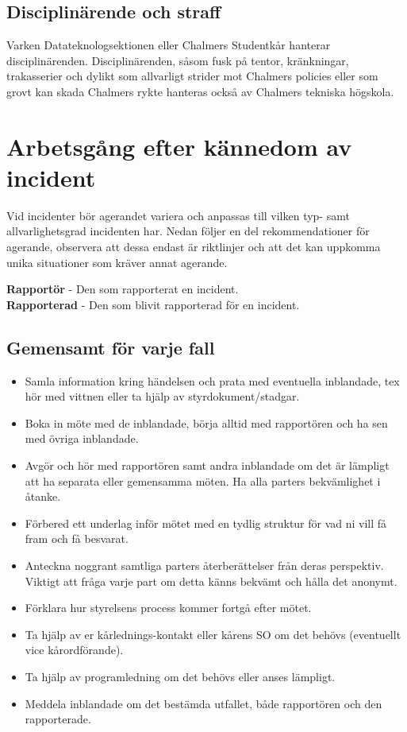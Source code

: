 \documentclass{dtek}
\begin{document}
\subsection{Disciplinärende och straff}
Varken Datateknologsektionen eller Chalmers Studentkår hanterar
disciplinärenden. Disciplinärenden, såsom fusk på tentor, kränkningar, trakasserier och dylikt som allvarligt strider mot Chalmers policies eller som
grovt kan skada Chalmers rykte hanteras också av Chalmers tekniska högskola.

\section{Arbetsgång efter kännedom av incident}
Vid incidenter bör agerandet variera och anpassas till vilken typ- samt allvarlighetsgrad incidenten har. Nedan följer en del rekommendationer för agerande, observera att dessa endast är riktlinjer och att det kan uppkomma unika situationer som kräver annat agerande. 

\textbf{Rapportör} - Den som rapporterat en incident. \\
\textbf{Rapporterad} - Den som blivit rapporterad för en incident. 

\subsection{Gemensamt för varje fall}

\begin{itemize}
    \item Samla information kring händelsen och prata med eventuella inblandade, tex hör med vittnen eller ta hjälp av styrdokument/stadgar. 
    \item Boka in möte med de inblandade, börja alltid med rapportören och ha sen med övriga inblandade.
    \item Avgör och hör med rapportören samt andra inblandade om det är lämpligt att ha separata eller gemensamma möten. Ha alla parters bekvämlighet i åtanke. 
    \item Förbered ett underlag inför mötet med en tydlig struktur för vad ni vill få fram och få besvarat. 
    \item Anteckna noggrant samtliga parters återberättelser från deras perspektiv. Viktigt att fråga varje part om detta känns bekvämt och hålla det anonymt. 
    \item Förklara hur styrelsens process kommer fortgå efter mötet. 
    \item Ta hjälp av er kårlednings-kontakt eller kårens SO om det behövs (eventuellt vice kårordförande). 
    \item Ta hjälp av programledning om det behövs eller anses lämpligt.
    \item Meddela inblandade om det bestämda utfallet, både rapportören och den rapporterade. 
\end{itemize}
\end{document}
